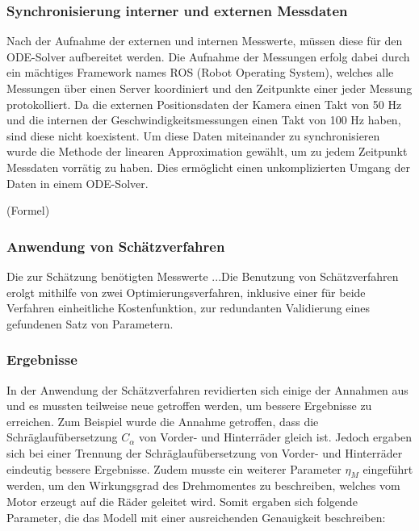 \subsubsection{Synchronisierung interner und externen Messdaten}
Nach der Aufnahme der externen und internen Messwerte, müssen diese für den ODE-Solver aufbereitet werden. Die Aufnahme der Messungen erfolg dabei durch ein mächtiges Framework names ROS (Robot Operating System), welches alle Messungen über einen Server koordiniert und den Zeitpunkte einer jeder Messung protokolliert. Da die externen Positionsdaten der Kamera einen Takt von 50 Hz und die internen der Geschwindigkeitsmessungen einen Takt von 100 Hz haben, sind diese nicht koexistent. Um diese Daten miteinander zu synchronisieren wurde die Methode der linearen Approximation gewählt, um zu jedem Zeitpunkt Messdaten vorrätig zu haben. Dies ermöglicht einen unkomplizierten Umgang der Daten in einem ODE-Solver. 

(Formel)

\subsubsection{Anwendung von Schätzverfahren}
Die zur Schätzung benötigten Messwerte ...Die Benutzung von Schätzverfahren erolgt mithilfe von zwei Optimierungsverfahren, inklusive einer für beide Verfahren einheitliche Kostenfunktion, zur redundanten Validierung eines gefundenen Satz von Parametern.  

\subsubsection{Ergebnisse}
In der Anwendung der Schätzverfahren revidierten sich einige der Annahmen aus \cite{VikAnd} und es mussten teilweise neue getroffen werden, um bessere Ergebnisse zu erreichen. Zum Beispiel wurde die Annahme getroffen, dass die Schräglaufübersetzung $C_{\alpha}$ von Vorder- und Hinterräder gleich ist. Jedoch ergaben sich bei einer Trennung der Schräglaufübersetzung von Vorder- und Hinterräder eindeutig bessere Ergebnisse. Zudem musste ein weiterer Parameter $\eta_M$ eingeführt werden, um den Wirkungsgrad des Drehmomentes zu beschreiben, welches vom Motor erzeugt auf die Räder geleitet wird. Somit ergaben sich folgende Parameter, die das Modell mit einer ausreichenden Genauigkeit beschreiben: 

